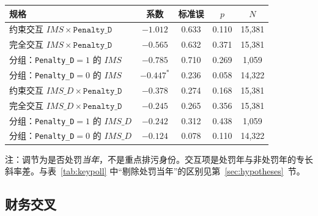 \documentclass[11pt]{article}
\begin{document}
\begin{center}
\begin{threeparttable}
\caption{环保处罚对照}
\label{tab:penalty}
\begin{tabular}{lcccc}
\toprule
规格 & 系数 & 标准误 & \(p\) & \(N\) \\
\midrule
约束交互 \(IMS\times\texttt{Penalty\_D}\) & \(-1.012\) & 0.633 & 0.110 & 15,381 \\
完全交互 \(IMS\times\texttt{Penalty\_D}\) & \(-0.565\) & 0.632 & 0.371 & 15,381 \\
分组：\texttt{Penalty\_D}\(=1\) 的 \(IMS\) & \(-0.785\) & 0.710 & 0.269 & 1,059 \\
分组：\texttt{Penalty\_D}\(=0\) 的 \(IMS\) & \(-0.447^{*}\) & 0.236 & 0.058 & 14,322 \\
\midrule
约束交互 \(IMS\_D\times\texttt{Penalty\_D}\) & \(-0.378\) & 0.274 & 0.168 & 15,381 \\
完全交互 \(IMS\_D\times\texttt{Penalty\_D}\) & \(-0.245\) & 0.265 & 0.356 & 15,381 \\
分组：\texttt{Penalty\_D}\(=1\) 的 \(IMS\_D\) & \(-0.242\) & 0.312 & 0.438 & 1,059 \\
分组：\texttt{Penalty\_D}\(=0\) 的 \(IMS\_D\) & \(-0.124\) & 0.078 & 0.110 & 14,322 \\
\bottomrule
\end{tabular}
\begin{tablenotes}\footnotesize
\item 注：调节为是否处罚\emph{当年}，不是重点排污身份。交互项是处罚年与非处罚年的专长斜率差。与表~\ref{tab:keypoll} 中``剔除处罚当年''的区别见第~\ref{sec:hypotheses}~节。
\end{tablenotes}
\end{threeparttable}
\end{center}

\subsection{财务交叉}
\end{document}
